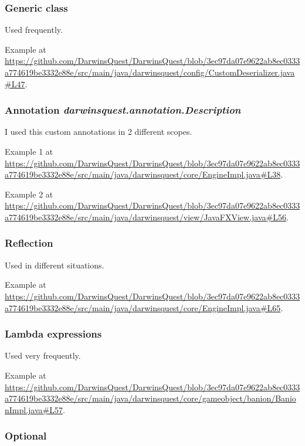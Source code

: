 \documentclass[12pt, a4paper]{report}
\begin{document}
        \subsubsection{Generic class}
        
        Used frequently.

        Example at \url{https://github.com/DarwinsQuest/DarwinsQuest/blob/3ec97da07e9622ab8ec0333a774619be3332e88e/src/main/java/darwinsquest/config/CustomDeserializer.java#L47}.

        \subsubsection{Annotation \emph{darwinsquest.annotation.Description}}

        I used this custom annotations in 2 different scopes.

        Example 1 at \url{https://github.com/DarwinsQuest/DarwinsQuest/blob/3ec97da07e9622ab8ec0333a774619be3332e88e/src/main/java/darwinsquest/core/EngineImpl.java#L38}.

        Example 2 at \url{https://github.com/DarwinsQuest/DarwinsQuest/blob/3ec97da07e9622ab8ec0333a774619be3332e88e/src/main/java/darwinsquest/view/JavaFXView.java#L56}.

        \subsubsection{Reflection}

        Used in different situations.

        Example at \url{https://github.com/DarwinsQuest/DarwinsQuest/blob/3ec97da07e9622ab8ec0333a774619be3332e88e/src/main/java/darwinsquest/core/EngineImpl.java#L65}.

        \subsubsection{Lambda expressions}

        Used very frequently.

        Example at \url{https://github.com/DarwinsQuest/DarwinsQuest/blob/3ec97da07e9622ab8ec0333a774619be3332e88e/src/main/java/darwinsquest/core/gameobject/banion/BanionImpl.java#L57}.

        \subsubsection{Optional}
\end{document}
